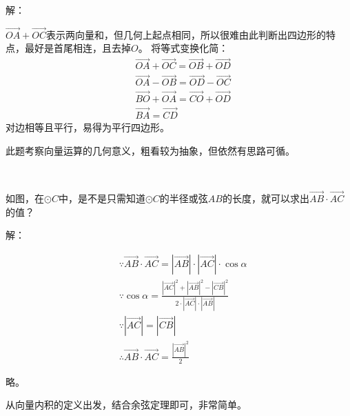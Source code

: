 解：

$\overrightarrow{OA}+\overrightarrow{OC}$表示两向量和，但几何上起点相同，所以很难由此判断出四边形的特点，最好是首尾相连，且去掉$O$。
将等式变换化简：
\begin{align*}
&\overrightarrow{OA}+\overrightarrow{OC}=\overrightarrow{OB}+\overrightarrow{OD} \\
&\overrightarrow{OA}-\overrightarrow{OB}=\overrightarrow{OD}-\overrightarrow{OC} \\
&\overrightarrow{BO}+\overrightarrow{OA}=\overrightarrow{CO}+\overrightarrow{OD} \\
&\overrightarrow{BA}=\overrightarrow{CD}
\end{align*}
对边相等且平行，易得为平行四边形。

\begin{tcolorbox}
此题考察向量运算的几何意义，粗看较为抽象，但依然有思路可循。
\end{tcolorbox}

~

\begin{example}
如图，在$\odot C$中，是不是只需知道$\odot C$的半径或弦$AB$的长度，就可以求出$\overrightarrow{AB}\cdot \overrightarrow{AC}$的值？
\end{example}

\begin{figure}[h]
\centering
{}
\end{figure}

解：

\begin{align*}
&\because \overrightarrow{AB}\cdot \overrightarrow{AC}=\left| \overrightarrow{AB} \right|\cdot \left| \overrightarrow{AC} \right|\cdot \cos \alpha \\
&\because \cos \alpha =\frac{\left| \overrightarrow{AC} \right|^2+\left| \overrightarrow{AB} \right|^2-\left| \overrightarrow{CB} \right|^2}{2\cdot \left| \overrightarrow{AC} \right|\cdot \left| \overrightarrow{AB} \right|} \\
&\because \left| \overrightarrow{AC} \right|=\left| \overrightarrow{CB} \right| \\
&\therefore \overrightarrow{AB}\cdot \overrightarrow{AC}=\frac{\left| \overrightarrow{AB} \right|^2}{2}
\end{align*}

略。

\begin{tcolorbox}
从向量内积的定义出发，结合余弦定理即可，非常简单。
\end{tcolorbox}




